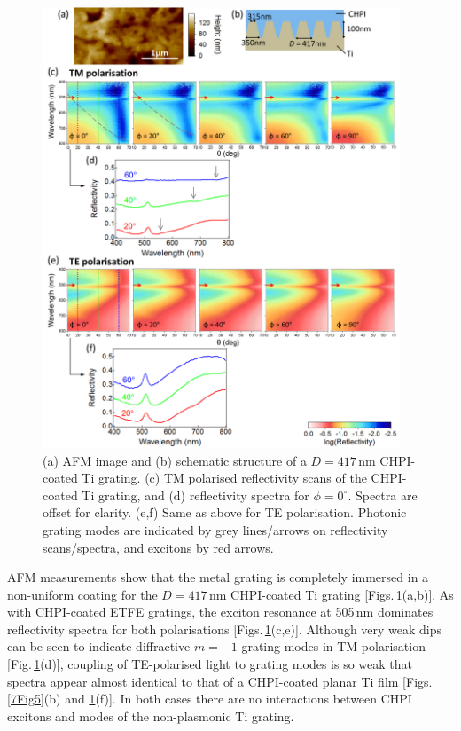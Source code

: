 \begin{figure}[h!] 
\centering    
\includegraphics[width=0.95\textwidth]{Fig6}
\caption[(a) AFM image and (b) schematic structure of $D=417$\,nm CHPI-coated Ti grating. Reflectivity measurements of CHPI-coated Ti grating in (c,d) TM and (e.f) TE polarisation.]{(a) AFM image and (b) schematic structure of a $D=417$\,nm CHPI-coated Ti grating. (c) TM polarised reflectivity scans of the CHPI-coated Ti grating, and (d) reflectivity spectra for $\phi=0^{\circ}$. Spectra are offset for clarity. (e,f) Same as above for TE polarisation. Photonic grating modes are indicated by grey lines/arrows on reflectivity scans/spectra, and excitons by red arrows.}
\label{7Fig6}
\end{figure}
AFM measurements show that the metal grating is completely immersed in a non-uniform coating for the $D=417$\,nm CHPI-coated Ti grating [Figs.\,\ref{7Fig6}(a,b)]. As with CHPI-coated ETFE gratings, the exciton resonance at 505\,nm dominates reflectivity spectra for both polarisations [Figs.\,\ref{7Fig6}(c,e)]. Although very weak dips can be seen to indicate diffractive $m=-1$ grating modes in TM polarisation [Fig.\,\ref{7Fig6}(d)], coupling of TE-polarised light to grating modes is so weak that spectra appear almost identical to that of a CHPI-coated planar Ti film [Figs.\,\ref{7Fig5}(b) and \ref{7Fig6}(f)]. In both cases there are no interactions between CHPI excitons and modes of the non-plasmonic Ti grating.

